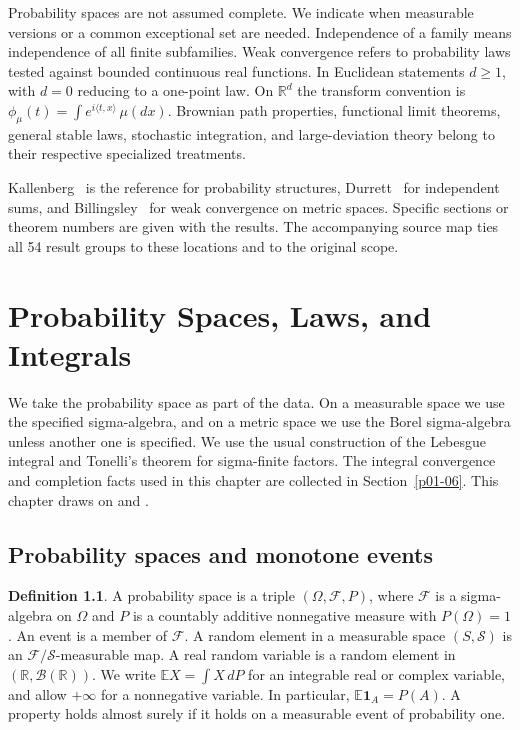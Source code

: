 \documentclass[11pt,oneside,openany]{book}
\newcommand{\R}{\mathbb{R}}
\theoremstyle{plain}
\theoremstyle{definition}
\newtheorem{definition}[theorem]{Definition}
\theoremstyle{remark}
\begin{document}
Probability spaces are not assumed complete. We indicate when measurable
versions or a common exceptional set are needed. Independence of a family
means independence of all finite subfamilies. Weak convergence refers to
probability laws tested against bounded continuous real functions. In
Euclidean statements \(d\ge 1\), with \(d=0\) reducing to a one-point law.
On \(\R^d\) the transform convention is
\(\phi_\mu(t)=\int e^{i\langle t,x\rangle}\,\mu(dx)\). Brownian path
properties, functional limit theorems, general stable laws, stochastic
integration, and large-deviation theory belong to their respective
specialized treatments.

Kallenberg~\cite{Kallenberg} is the reference for probability structures,
Durrett~\cite{Durrett} for independent sums, and Billingsley~\cite{Billingsley}
for weak convergence on metric spaces. Specific sections or theorem numbers
are given with the results. The accompanying source map ties all 54
result groups to these locations and to the original scope.

\mainmatter
\chapter{Probability Spaces, Laws, and Integrals}
\label{chap:probability-foundations}

We take the probability space as part of the data. On a measurable space we
use the specified sigma-algebra, and on a metric space we use the Borel
sigma-algebra unless another one is specified. We use the usual construction
of the Lebesgue integral and Tonelli's theorem for sigma-finite factors. The
integral convergence and completion facts used in this chapter are collected in
Section~\ref{p01-06}. This chapter draws on
\cite[Chapter 1 and Theorem 2.14]{Kallenberg} and
\cite[Sections 1.1--1.7]{Durrett}.

\section{Probability spaces and monotone events}
\label{p01-01}

\begin{definition}
A probability space is a triple \((\Omega,\mathcal F,P)\), where
\(\mathcal F\) is a sigma-algebra on \(\Omega\) and \(P\) is a countably
additive nonnegative measure with \(P(\Omega)=1\). An event is a member of
\(\mathcal F\). A random element in a measurable space
\((S,\mathcal S)\) is an \(\mathcal F/\mathcal S\)-measurable map. A real
random variable is a random element in \((\mathbb R,\mathcal B(\mathbb R))\).
We write \(\mathbb E X=\int X\,dP\) for an integrable real or complex
variable, and allow \(+\infty\) for a nonnegative variable. In particular,
\(\mathbb E\mathbf 1_A=P(A)\). A property holds almost surely if it holds
on a measurable event of probability one.
\end{definition}
\end{document}
